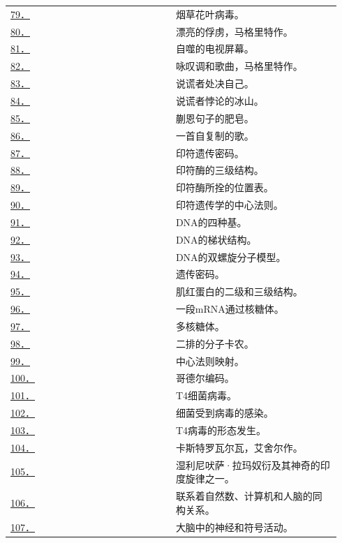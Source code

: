 \documentclass[
  12pt,
  twoside,
  openright,
  oldfontcommands,
]{memoir}
\begin{document}
\begin{longtable}[]{>{\raggedright\arraybackslash}p{0.47\linewidth} >{\raggedright\arraybackslash}p{0.47\linewidth}}
\hyperref[fig:79]{79．} & 烟草花叶病毒。 \\
\hyperref[fig:80]{80．} & 漂亮的俘虏，马格里特作。 \\
\hyperref[fig:81]{81．} & 自噬的电视屏幕。 \\
\hyperref[fig:82]{82．} & 咏叹调和歌曲，马格里特作。 \\
\hyperref[fig:83]{83．} & 说谎者处决自己。 \\
\hyperref[fig:84]{84．} & 说谎者悖论的冰山。 \\
\hyperref[fig:85]{85．} & 蒯恩句子的肥皂。 \\
\hyperref[fig:86]{86．} & 一首自复制的歌。 \\
\hyperref[fig:87]{87．} & 印符遗传密码。 \\
\hyperref[fig:88]{88．} & 印符酶的三级结构。 \\
\hyperref[fig:89]{89．} & 印符酶所拴的位置表。 \\
\hyperref[fig:90]{90．} & 印符遗传学的中心法则。 \\
\hyperref[fig:91]{91．} & DNA的四种基。 \\
\hyperref[fig:92]{92．} & DNA的梯状结构。 \\
\hyperref[fig:93]{93．} & DNA的双螺旋分子模型。 \\
\hyperref[fig:94]{94．} & 遗传密码。 \\
\hyperref[fig:95]{95．} & 肌红蛋白的二级和三级结构。 \\
\hyperref[fig:96]{96．} & 一段mRNA通过核糖体。 \\
\hyperref[fig:97]{97．} & 多核糖体。 \\
\hyperref[fig:98]{98．} & 二排的分子卡农。 \\
\hyperref[fig:99]{99．} & 中心法则映射。 \\
\hyperref[fig:100]{100．} & 哥德尔编码。 \\
\hyperref[fig:101]{101．} & T4细菌病毒。 \\
\hyperref[fig:102]{102．} & 细菌受到病毒的感染。 \\
\hyperref[fig:103]{103．} & T4病毒的形态发生。 \\
\hyperref[fig:104]{104．} & 卡斯特罗瓦尔瓦，艾舍尔作。 \\
\hyperref[fig:105]{105．} & 湿利尼吠萨·拉玛奴衍及其神奇的印度旋律之一。 \\
\hyperref[fig:106]{106．} & 联系着自然数、计算机和人脑的同构关系。 \\
\hyperref[fig:107]{107．} & 大脑中的神经和符号活动。 \\

\end{longtable}
\end{document}
